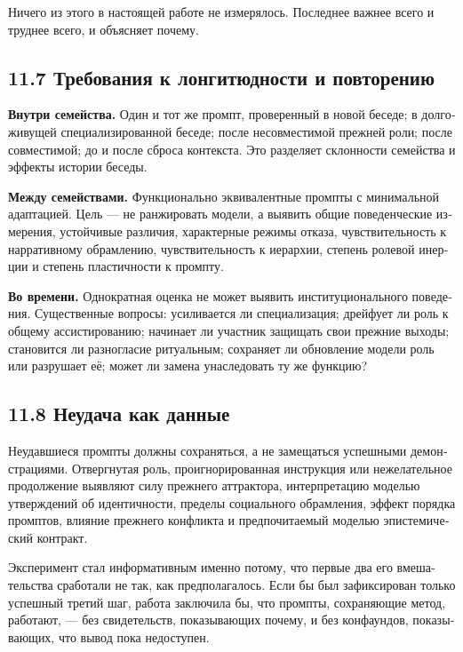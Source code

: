 \begin{russian}
Ничего из этого в настоящей работе не измерялось. Последнее важнее всего и труднее всего, и  объясняет почему.


\subsection*{11.7 Требования к лонгитюдности и повторению}
\label{sec:ru:11.7}

\textbf{Внутри семейства.} Один и тот же промпт, проверенный в новой беседе; в долгоживущей специализированной беседе; после несовместимой прежней роли; после совместимой; до и после сброса контекста. Это разделяет склонности семейства и эффекты истории беседы.

\textbf{Между семействами.} Функционально эквивалентные промпты с минимальной адаптацией. Цель — не ранжировать модели, а выявить общие поведенческие измерения, устойчивые различия, характерные режимы отказа, чувствительность к нарративному обрамлению, чувствительность к иерархии, степень ролевой инерции и степень пластичности к промпту.

\textbf{Во времени.} Однократная оценка не может выявить институционального поведения. Существенные вопросы: усиливается ли специализация; дрейфует ли роль к общему ассистированию; начинает ли участник защищать свои прежние выходы; становится ли разногласие ритуальным; сохраняет ли обновление модели роль или разрушает её; может ли замена унаследовать ту же функцию?


\subsection*{11.8 Неудача как данные}
\label{sec:ru:11.8}

Неудавшиеся промпты должны сохраняться, а не замещаться успешными демонстрациями. Отвергнутая роль, проигнорированная инструкция или нежелательное продолжение выявляют силу прежнего аттрактора, интерпретацию моделью утверждений об идентичности, пределы социального обрамления, эффект порядка промптов, влияние прежнего конфликта и предпочитаемый моделью эпистемический контракт.

Эксперимент  стал информативным именно потому, что первые два его вмешательства сработали не так, как предполагалось. Если бы был зафиксирован только успешный третий шаг, работа заключила бы, что промпты, сохраняющие метод, работают, — без свидетельств, показывающих почему, и без конфаундов, показывающих, что вывод пока недоступен.



\end{russian}
